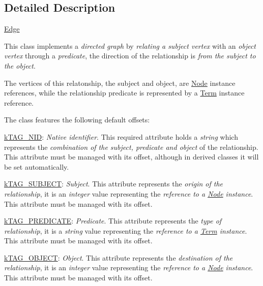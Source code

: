 \subsection{Detailed Description}
\hyperlink{class_ontology_wrapper_1_1_edge}{Edge}

This class implements a {\itshape directed graph} by {\itshape relating a subject vertex} with an {\itshape object vertex} through a {\itshape predicate}, the direction of the relationship is {\itshape from the subject to the object}.

The vertices of this relatonship, the subject and object, are \hyperlink{class_ontology_wrapper_1_1_node}{Node} instance references, while the relationship predicate is represented by a \hyperlink{class_ontology_wrapper_1_1_term}{Term} instance reference.

The class features the following default offsets\-:


\begin{DoxyItemize}
\item {\ttfamily \hyperlink{}{k\-T\-A\-G\-\_\-\-N\-I\-D}}\-: {\itshape Native identifier}. This required attribute holds a {\itshape string} which represents the {\itshape combination of the subject, predicate and object} of the relationship. This attribute must be managed with its offset, although in derived classes it will be set automatically. 
\item {\ttfamily \hyperlink{}{k\-T\-A\-G\-\_\-\-S\-U\-B\-J\-E\-C\-T}}\-: {\itshape Subject}. This attribute represents the {\itshape origin of the relationship}, it is an {\itshape integer} value representing the {\itshape reference to a \hyperlink{class_ontology_wrapper_1_1_node}{Node} instance}. This attribute must be managed with its offset. 
\item {\ttfamily \hyperlink{}{k\-T\-A\-G\-\_\-\-P\-R\-E\-D\-I\-C\-A\-T\-E}}\-: {\itshape Predicate}. This attribute represents the {\itshape type of relationship}, it is a {\itshape string} value representing the {\itshape reference to a \hyperlink{class_ontology_wrapper_1_1_term}{Term} instance}. This attribute must be managed with its offset. 
\item {\ttfamily \hyperlink{}{k\-T\-A\-G\-\_\-\-O\-B\-J\-E\-C\-T}}\-: {\itshape Object}. This attribute represents the {\itshape destination of the relationship}, it is an {\itshape integer} value representing the {\itshape reference to a \hyperlink{class_ontology_wrapper_1_1_node}{Node} instance}. This attribute must be managed with its offset. 
\end{DoxyItemize}

